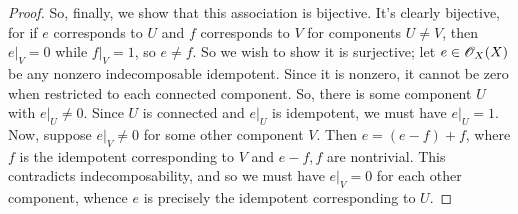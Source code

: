 \begin{proof}
	So, finally, we show that this association is bijective. It's clearly bijective, for if $e$ corresponds to $U$ and $f$ corresponds to $V$ for components $U \neq V$, then $e|_V = 0$ while $f|_V = 1$, so $e \neq f$. So we wish to show it is surjective; let $e \in \mathscr{O}_X(X)$ be any nonzero indecomposable idempotent. Since it is nonzero, it cannot be zero when restricted to each connected component. So, there is some component $U$ with $e|_U \neq 0$. Since $U$ is connected and $e|_U$ is idempotent, we must have $e|_U = 1$. Now, suppose $e|_V \neq 0$ for some other component $V$. Then $e = (e-f) + f$, where $f$ is the idempotent corresponding to $V$ and $e-f,f$ are nontrivial. This contradicts indecomposability, and so we must have $e|_V = 0$ for each other component, whence $e$ is precisely the idempotent corresponding to $U$.
\end{proof}
